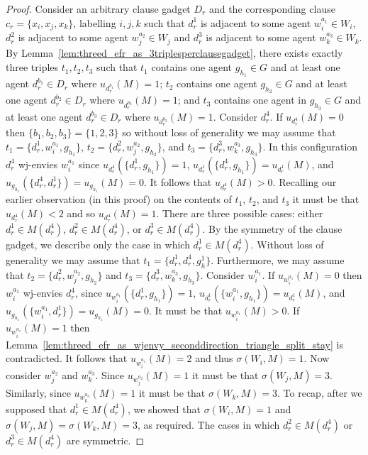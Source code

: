 \begin{proof}
Consider an arbitrary clause gadget $D_r$ and the corresponding clause $c_r=\{ x_i, x_j, x_k\}$, labelling $i, j, k$ such that $d_r^1$ is adjacent to some agent $w_i^{a_1} \in W_i$, $d_r^2$ is adjacent to some agent $w_j^{a_2} \in W_j$ and $d_r^3$ is adjacent to some agent $w_k^{a_3} \in W_k$. By Lemma~\ref{lem:threed_efr_as_3triplesperclausegadget}, there exists exactly three triples $t_1, t_2, t_3$ such that $t_1$ contains one agent $g_{h_1}\in G$ and at least one agent $d_r^{b_1} \in D_r$ where $u_{d_r^{b_1}}(M)=1$; $t_2$ contains one agent $g_{h_2}\in G$ and at least one agent $d_r^{b_2} \in D_r$ where $u_{d_r^{b_2}}(M)=1$; and $t_3$ contains one agent in $g_{h_3}\in G$ and at least one agent $d_r^{b_3} \in D_r$ where $u_{d_r^{b_3}}(M)=1$. Consider $d_r^4$. If $u_{d_r^4}(M)=0$ then $\{ b_1, b_2, b_3 \} = \{ 1, 2, 3 \}$ so without loss of generality we may assume that  $t_1 = \{ d_r^1, w_i^{a_1}, g_{h_1} \}$, $t_2 = \{ d_r^2, w_j^{a_2}, g_{h_2} \}$, and $t_3 = \{ d_r^3, w_k^{a_3}, g_{h_3} \}$. In this configuration $d_r^4$ wj-envies $w_i^{a_1}$ since $u_{d_r^4}(\{ d_r^1, g_{h_1} \})=1$, $u_{d_r^1}(\{ d_r^4, g_{h_1} \}) = u_{d_r^1}(M)$, and $u_{g_{h_1}}(\{ d_r^4, d_r^1 \}) = u_{g_{h_1}}(M) = 0$. It follows that $u_{d_r^4}(M)>0$. Recalling our earlier observation (in this proof) on the contents of $t_1$, $t_2$, and $t_3$ it must be that $u_{d_r^4}(M)<2$ and so $u_{d_r^4}(M)=1$. There are three possible cases: either $d_r^1 \in M(d_r^4)$, $d_r^2 \in M(d_r^4)$, or $d_r^3 \in M(d_r^4)$. By the symmetry of the clause gadget, we describe only the case in which $d_r^1 \in M(d_r^4)$. Without loss of generality we may assume that $t_1 = \{ d_r^1, d_r^4, g_h^1 \}$. Furthermore, we may assume that $t_2 = \{ d_r^2, w_j^{a_2}, g_{h_2} \}$ and $t_3 = \{ d_r^3, w_k^{a_3}, g_{h_3} \}$. Consider $w_i^{a_1}$. If $u_{w_i^{a_1}}(M)=0$ then $w_i^{a_1}$ wj-envies $d_r^4$, since $u_{w_i^{a_1}}(\{ d_r^1, g_{h_1} \})=1$, $u_{d_r^1}(\{ w_i^{a_1}, g_{h_1} \}) = u_{d_r^1}(M)$, and $u_{g_{h_1}}(\{ w_i^{a_1}, d_r^1 \}) = u_{g_{h_1}}(M) = 0$. It must be that $u_{w_i^{a_1}}(M)>0$. If $u_{w_i^{a_1}}(M)=1$ then Lemma~\ref{lem:threed_efr_as_wjenvy_seconddirection_triangle_split_stay} is contradicted. It follows that $u_{w_i^{a_1}}(M)=2$ and thus $\sigma(W_i, M)=1$. Now consider $w_j^{a_2}$ and $w_k^{a_3}$. Since $u_{w_j^{a_2}}(M)=1$ it must be that $\sigma(W_j, M)=3$. Similarly, since $u_{w_k^{a_3}}(M)=1$ it must be that $\sigma(W_k, M)=3$. To recap, after we supposed that $d_r^1 \in M(d_r^4)$, we showed that $\sigma(W_i, M)=1$ and $\sigma(W_j, M)=\sigma(W_k, M)=3$, as required. The cases in which $d_r^2 \in M(d_r^4)$ or $d_r^3 \in M(d_r^4)$ are symmetric.
\end{proof}

